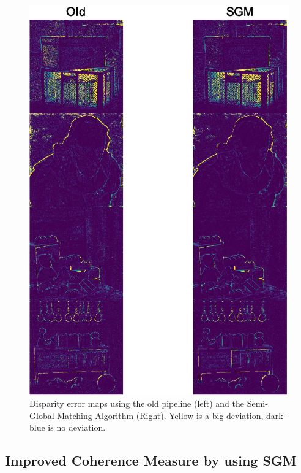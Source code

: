\documentclass  [
  paper    = a4,
  BCOR     = 10mm,
  twoside,
  fontsize = 12pt,
  fleqn,
  toc      = bibnumbered,
  toc      = listofnumbered,
  numbers  = noendperiod,
  headings = normal,
  listof   = leveldown,
  version  = 3.03
]                                       {scrreprt}
\begin{document}
\begin{figure}
	\centering
	\includegraphics[width=1\linewidth]{images/sgm_results_thresh}
	\caption[Semi-Global Matching Results]{Disparity error maps using the old pipeline (left) and the Semi-Global Matching Algorithm (Right). Yellow is a big deviation, dark-blue is no deviation.}
	\label{fig:sgmresultsthresh}
\end{figure}





\subsection*{Improved Coherence Measure by using SGM}
\end{document}
